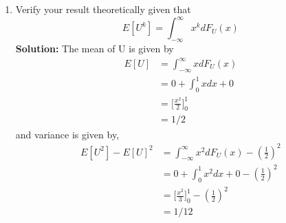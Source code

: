 \documentclass[journal,12pt,twocolumn]{IEEEtran}
\renewcommand\thesection{\arabic{section}}
\providecommand{\sbrak}[1]{\ensuremath{{}\left[#1\right]}}
\providecommand{\brak}[1]{\ensuremath{\left(#1\right)}}
\theoremstyle{remark}
\newcommand{\solution}{\noindent \textbf{Solution: }}
\numberwithin{equation}{section}
\begin{document}
\begin{enumerate}[label=\thesection.\arabic*
,ref=\thesection.\theenumi]
\item Verify your result theoretically given that
\begin{equation}
	E\sbrak{U^k} = \int_{-\infty}^{\infty}x^kdF_{U}(x)
\end{equation}
\solution The mean of U is given by
\begin{align}
	E[U]&=\int_{-\infty}^{\infty}xdF_U(x)\\
	&=0+\int_{0}^{1}xdx+0\\
	&=\bigg[\frac{x^2}{2}\bigg]_0^1\\
	&=1/2
\end{align}
and variance is given by,
\begin{align}
	E[U^2]-E[U]^2&=\int_{-\infty}^{\infty}x^2dF_U(x)-\brak{\frac{1}{2}}^2\\
	&=0+\int_{0}^{1}x^2dx+0-\brak{\frac{1}{2}}^2\\
	&=\Bigg[\frac{x^2}{3}\Bigg]_0^1-\brak{\frac{1}{2}}^2\\
	&=1/12
\end{align}
\end{enumerate}
%
\end{document}
